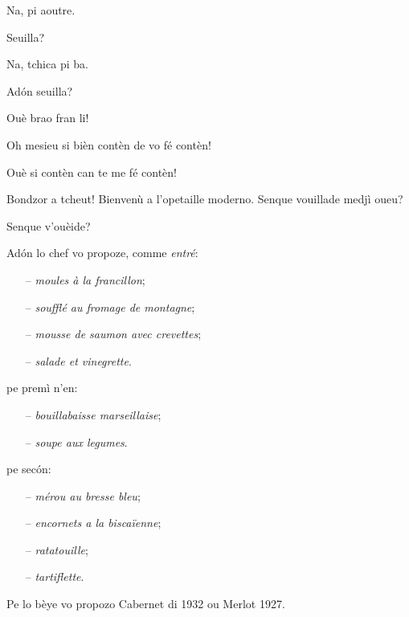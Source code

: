 \begin{drama}
\PersEmpourtantaspeaks Na, pi aoutre.

\Eunfeurmispeaks Seuilla?

\PersEmpourtantaspeaks Na, tchica pi ba.

\Eunfeurmispeaks Ad\'on seuilla?

\PersEmpourtantaspeaks Ouè brao fran li!

\Eunfeurmispeaks Oh mesieu si bièn contèn de vo fé contèn!

\PersEmpourtantaspeaks Ouè si contèn can te me fé contèn!


\Tsambrispeaks Bondzor a tcheut! Bienvenù a l’opetaille moderno. Senque vouillade medjì oueu?

\PersEmpourtantaspeaks Senque v'ouèide?

\Tsambrispeaks {} Ad\'on lo chef vo propoze, comme \textit{entré}:

\begin{itemize}
\item[--]  \textit{moules à la francillon};
\item[--]  \textit{soufflé au fromage de montagne};
\item[--]  \textit{mousse de saumon avec crevettes};
\item[--]  \textit{salade et vinegrette}.
\end{itemize}

pe premì n’en:

\begin{itemize}
\item[--]  \textit{bouillabaisse marseillaise};
\item[--]  \textit{soupe aux legumes}.
\end{itemize}

pe sec\'on:

\begin{itemize}
\item[--] \textit{mérou au bresse bleu};
\item[--]  \textit{encornets a la biscaïenne};
\item[--]  \textit{ratatouille};
\item[--]  \textit{tartiflette}.
\end{itemize}

Pe lo bèye vo propozo Cabernet di 1932 ou Merlot 1927.


\end{drama}
